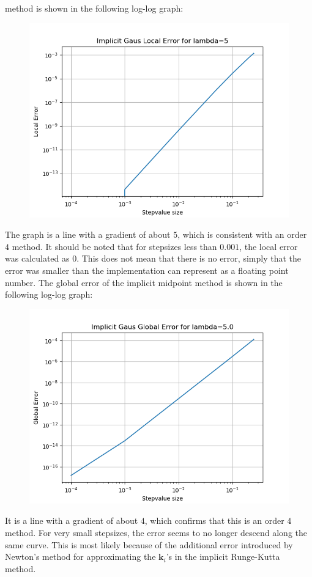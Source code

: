 \documentclass{article}
\theoremstyle{definition}
\begin{document}
\begin{itemize}
		method is shown in the following log-log graph:
		\begin{figure}[H]
			\includegraphics[scale=0.6]{implicit_gauss_local_loglog}
		\end{figure}
		The graph is a line with a gradient of about $5$, which is
		consistent with an order $4$ method.  It should be noted that
		for stepsizes less than $0.001$, the local error was calculated
		as $0$.  This does not mean that there is no error, simply that
		the error was smaller than the implementation can represent as a
		floating point number.
		The global error of the implicit midpoint
		method is shown in the following log-log graph:
		\begin{figure}[H]
			\includegraphics[scale=0.6]{implicit_gauss_global_loglog}
		\end{figure}
		It is a line with a gradient of about $4$, which confirms that
		this is an order $4$ method. For very small stepsizes, the error
		seems to no longer descend along the same curve.  This is most
		likely because of the additional error introduced by Newton's
		method for approximating the $\mathbf{k}_i$'s in the implicit Runge-Kutta
		method.



\end{itemize}
\end{document}
